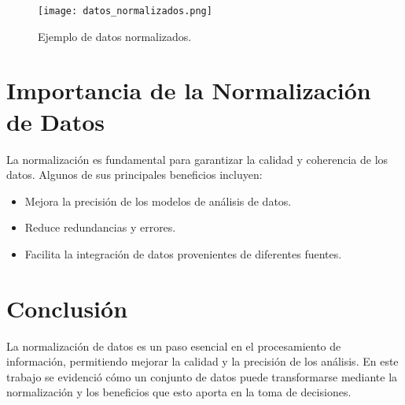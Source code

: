 \documentclass[12pt]{article}
\begin{document}
\begin{figure}[h]
    \centering
    \texttt{[image: datos\_normalizados.png]}
    \caption{Ejemplo de datos normalizados.}
    \label{fig:normalizados}
\end{figure}

\section{Importancia de la Normalización de Datos}
La normalización es fundamental para garantizar la calidad y coherencia de los datos. Algunos de sus principales beneficios incluyen:
\begin{itemize}
    \item Mejora la precisión de los modelos de análisis de datos.
    \item Reduce redundancias y errores.
    \item Facilita la integración de datos provenientes de diferentes fuentes.
\end{itemize}

\section{Conclusión}
La normalización de datos es un paso esencial en el procesamiento de información, permitiendo mejorar la calidad y la precisión de los análisis. En este trabajo se evidenció cómo un conjunto de datos puede transformarse mediante la normalización y los beneficios que esto aporta en la toma de decisiones.
\end{document}

